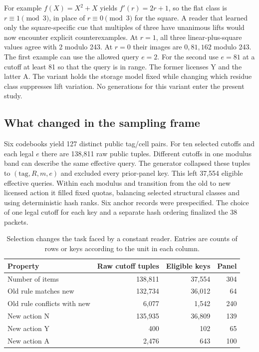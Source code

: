 \documentclass[12pt,letterpaper]{article}
\begin{document}
For example $f(X)=X^2+X$ yields $f'(r)=2r+1$, so the flat class is $r\equiv1\pmod3$, in place of $r\equiv0\pmod3$ for the square. A reader that learned only the square-specific cue that multiples of three have unanimous lifts would now encounter explicit counterexamples. At $r=1$, all three linear-plus-square values agree with 2 modulo 243. At $r=0$ their images are $0,81,162$ modulo 243. The first example can use the allowed query $e=2$. For the second use $e=81$ at a cutoff at least 81 so that the query is in range. The former licenses Y and the latter A. The variant holds the storage model fixed while changing which residue class suppresses lift variation. No generations for this variant enter the present study.

\subsection{What changed in the sampling frame}
Six codebooks yield 127 distinct public tag/cell pairs. For ten selected cutoffs and each legal $e$ there are 138,811 raw public tuples. Different cutoffs in one modulus band can describe the same effective query. The generator collapsed these tuples to $(\mathrm{tag},R,m,e)$ and excluded every prior-panel key. This left 37,554 eligible effective queries. Within each modulus and transition from the old to new licensed action it filled fixed quotas, balancing selected structural classes and using deterministic hash ranks. Six anchor records were prespecified. The choice of one legal cutoff for each key and a separate hash ordering finalized the 38 packets.

\begin{table}[htbp]\centering\small
\caption{Selection changes the task faced by a constant reader. Entries are counts of rows or keys according to the unit in each column.}\label{tab:base}
\begin{tabular}{@{}lrrr@{}}\toprule
Property & Raw cutoff tuples & Eligible keys & Panel\\\midrule
Number of items &138,811&37,554&304\\
Old rule matches new &132,734&36,012&64\\
Old rule conflicts with new &6,077&1,542&240\\
New action N &135,935&36,809&139\\
New action Y &400&102&65\\
New action A &2,476&643&100\\\bottomrule
\end{tabular}
\end{table}
\end{document}
